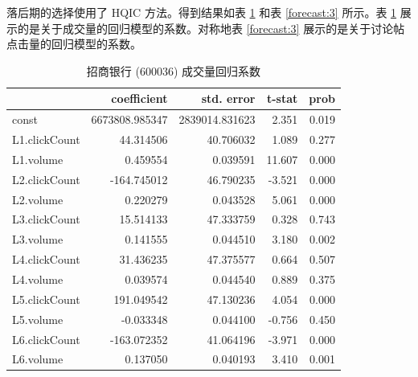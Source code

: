 落后期的选择使用了 HQIC 方法。得到结果如表 \ref{forecast:2} 和表 \ref{forecast:3} 所示。表 \ref{forecast:2} 展示的是关于成交量的回归模型的系数。对称地表 \ref{forecast:3} 展示的是关于讨论帖点击量的回归模型的系数。

\begin{table}
  \centering
  \caption{招商银行 (600036) 成交量回归系数}
  \label{forecast:2}
  \begin{tabular}{lrrrr}
    \toprule
    & coefficient & std. error & t-stat & prob \\
    \midrule
    const & 6673808.985347 & 2839014.831623 & 2.351 & 0.019 \\
    L1.clickCount & 44.314506 & 40.706032 & 1.089 & 0.277 \\
    L1.volume & 0.459554 & 0.039591 & 11.607 & 0.000 \\
    L2.clickCount & -164.745012 & 46.790235 & -3.521 & 0.000 \\
    L2.volume & 0.220279 & 0.043528 & 5.061 & 0.000 \\
    L3.clickCount & 15.514133 & 47.333759 & 0.328 & 0.743 \\
    L3.volume & 0.141555 & 0.044510 & 3.180 & 0.002 \\
    L4.clickCount & 31.436235 & 47.375577 & 0.664 & 0.507 \\
    L4.volume & 0.039574 & 0.044540 & 0.889 & 0.375 \\
    L5.clickCount & 191.049542 & 47.130236 & 4.054 & 0.000 \\
    L5.volume & -0.033348 & 0.044100 & -0.756 & 0.450 \\
    L6.clickCount & -163.072352 & 41.064196 & -3.971 & 0.000 \\
    L6.volume & 0.137050 & 0.040193 & 3.410 & 0.001 \\
    \bottomrule
  \end{tabular}
\end{table}

